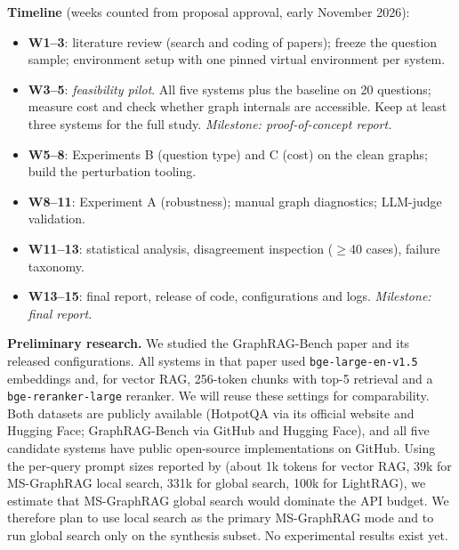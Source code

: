 \documentclass[11pt]{article}
\begin{document}
\textbf{Timeline} (weeks counted from proposal approval, early November 2026):
\begin{itemize}
\item \textbf{W1--3}: literature review (search and coding of papers); freeze the question sample; environment setup with one pinned virtual environment per system.
\item \textbf{W3--5}: \emph{feasibility pilot}. All five systems plus the baseline on 20 questions; measure cost and check whether graph internals are accessible. Keep at least three systems for the full study. \emph{Milestone: proof-of-concept report.}
\item \textbf{W5--8}: Experiments B (question type) and C (cost) on the clean graphs; build the perturbation tooling.
\item \textbf{W8--11}: Experiment A (robustness); manual graph diagnostics; LLM-judge validation.
\item \textbf{W11--13}: statistical analysis, disagreement inspection ($\geq$40 cases), failure taxonomy.
\item \textbf{W13--15}: final report, release of code, configurations and logs. \emph{Milestone: final report.}
\end{itemize}

\textbf{Preliminary research.} We studied the GraphRAG-Bench paper and its released configurations. All systems in that paper used \texttt{bge-large-en-v1.5} embeddings and, for vector RAG, 256-token chunks with top-5 retrieval and a \texttt{bge-reranker-large} reranker. We will reuse these settings for comparability. Both datasets are publicly available (HotpotQA via its official website and Hugging Face; GraphRAG-Bench via GitHub and Hugging Face), and all five candidate systems have public open-source implementations on GitHub. Using the per-query prompt sizes reported by  (about 1k tokens for vector RAG, 39k for MS-GraphRAG local search, 331k for global search, 100k for LightRAG), we estimate that MS-GraphRAG global search would dominate the API budget. We therefore plan to use local search as the primary MS-GraphRAG mode and to run global search only on the synthesis subset. No experimental results exist yet.
\end{document}
